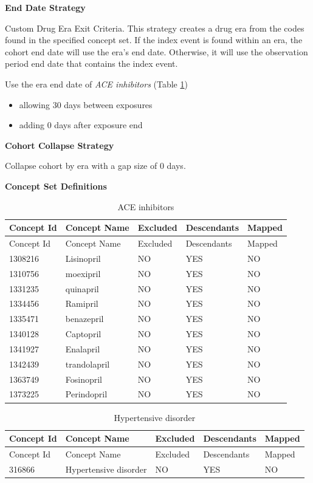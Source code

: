 \documentclass[11pt]{book}
\providecommand{\tightlist}{%
  \setlength{\itemsep}{0pt}\setlength{\parskip}{0pt}}
\begin{document}
\textbf{End Date Strategy}

Custom Drug Era Exit Criteria. This strategy creates a drug era from the
codes found in the specified concept set. If the index event is found
within an era, the cohort end date will use the era's end date.
Otherwise, it will use the observation period end date that contains the
index event.

Use the era end date of \emph{ACE inhibitors} (Table
\ref{tab:aceInhibitorsMono})

\begin{itemize}
\tightlist
\item
  allowing 30 days between exposures
\item
  adding 0 days after exposure end
\end{itemize}

\textbf{Cohort Collapse Strategy}

Collapse cohort by era with a gap size of 0 days.

\textbf{Concept Set Definitions}

\begin{longtable}[]{@{}lllll@{}}
\caption{\label{tab:aceInhibitorsMono} ACE inhibitors}\tabularnewline
\toprule
Concept Id & Concept Name & Excluded & Descendants &
Mapped\tabularnewline
\midrule
\endfirsthead
\toprule
Concept Id & Concept Name & Excluded & Descendants &
Mapped\tabularnewline
\midrule
\endhead
1308216 & Lisinopril & NO & YES & NO\tabularnewline
1310756 & moexipril & NO & YES & NO\tabularnewline
1331235 & quinapril & NO & YES & NO\tabularnewline
1334456 & Ramipril & NO & YES & NO\tabularnewline
1335471 & benazepril & NO & YES & NO\tabularnewline
1340128 & Captopril & NO & YES & NO\tabularnewline
1341927 & Enalapril & NO & YES & NO\tabularnewline
1342439 & trandolapril & NO & YES & NO\tabularnewline
1363749 & Fosinopril & NO & YES & NO\tabularnewline
1373225 & Perindopril & NO & YES & NO\tabularnewline
\bottomrule
\end{longtable}

\begin{longtable}[]{@{}lllll@{}}
\caption{\label{tab:hypertensionAceMono} Hypertensive
disorder}\tabularnewline
\toprule
Concept Id & Concept Name & Excluded & Descendants &
Mapped\tabularnewline
\midrule
\endfirsthead
\toprule
Concept Id & Concept Name & Excluded & Descendants &
Mapped\tabularnewline
\midrule
\endhead
316866 & Hypertensive disorder & NO & YES & NO\tabularnewline
\bottomrule
\end{longtable}
\end{document}
